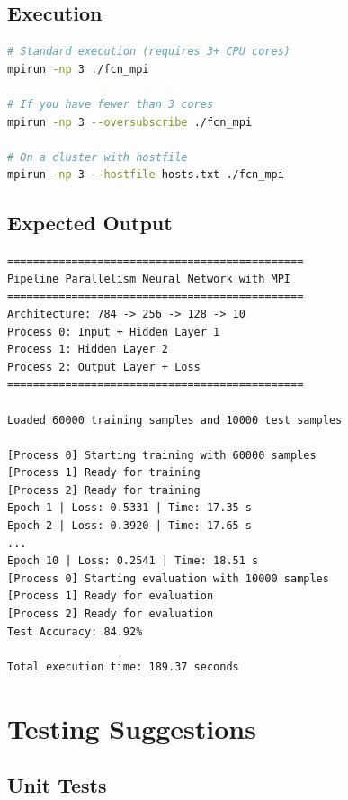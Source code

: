 \documentclass[11pt,a4paper]{article}
\begin{document}
\subsection{Execution}

\begin{lstlisting}[language=bash, caption={Running the program}]
# Standard execution (requires 3+ CPU cores)
mpirun -np 3 ./fcn_mpi

# If you have fewer than 3 cores
mpirun -np 3 --oversubscribe ./fcn_mpi

# On a cluster with hostfile
mpirun -np 3 --hostfile hosts.txt ./fcn_mpi
\end{lstlisting}

\subsection{Expected Output}

\begin{lstlisting}[caption={Sample output}]
==============================================
Pipeline Parallelism Neural Network with MPI
==============================================
Architecture: 784 -> 256 -> 128 -> 10
Process 0: Input + Hidden Layer 1
Process 1: Hidden Layer 2
Process 2: Output Layer + Loss
==============================================

Loaded 60000 training samples and 10000 test samples

[Process 0] Starting training with 60000 samples
[Process 1] Ready for training
[Process 2] Ready for training
Epoch 1 | Loss: 0.5331 | Time: 17.35 s
Epoch 2 | Loss: 0.3920 | Time: 17.65 s
...
Epoch 10 | Loss: 0.2541 | Time: 18.51 s
[Process 0] Starting evaluation with 10000 samples
[Process 1] Ready for evaluation
[Process 2] Ready for evaluation
Test Accuracy: 84.92%

Total execution time: 189.37 seconds
\end{lstlisting}

\section{Testing Suggestions}

\subsection{Unit Tests}
\end{document}
